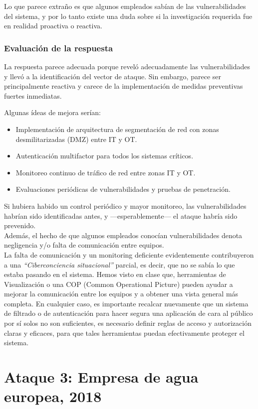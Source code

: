 Lo que parece extraño es que algunos empleados sabían de las vulnerabilidades del sistema, y por lo tanto existe una duda sobre si la investigación requerida fue en realidad proactiva o reactiva.

\subsubsection{Evaluación de la respuesta}
La respuesta parece adecuada porque reveló adecuadamente las vulnerabilidades y llevó a la identificación del vector de ataque. Sin embargo, parece ser principalmente reactiva y carece de la implementación de medidas preventivas fuertes inmediatas.

Algunas ídeas de mejora serían:
\begin{itemize}
    \item Implementación de arquitectura de segmentación de red con zonas desmilitarizadas (DMZ) entre IT y OT.
    \item Autenticación multifactor para todos los sistemas críticos.
    \item Monitoreo continuo de tráfico de red entre zonas IT y OT.
    \item Evaluaciones periódicas de vulnerabilidades y pruebas de penetración.
\end{itemize}

Si hubiera habido un control periódico y mayor monitoreo, las vulnerabilidades habrían sido identificadas antes, y ---esperablemente--- el ataque habría sido prevenido.\\
Además, el hecho de que algunos empleados conocían vulnerabilidades denota negligencia y/o falta de comunicación entre equipos.\\
La falta de comunicación y un monitoring deficiente evidentemente contribuyeron a una \textit{``Ciberconciencia situacional''} parcial, es decir, que no se sabía lo que estaba pasando en el sistema. Hemos visto en clase que, herramientas de Visualización o una COP (Common Operational Picture) pueden ayudar a mejorar la comunicación entre los equipos y a obtener una vista general más completa.
En cualquier caso, es importante recalcar nuevamente que un sistema de filtrado o de autenticación para hacer segura una aplicación de cara al público por sí solos no son suficientes, es necesario definir reglas de acceso y autorización claras y eficaces, para que tales herramientas puedan efectivamente proteger el sistema.
\newpage
\section{Ataque 3: Empresa de agua europea, 2018}

